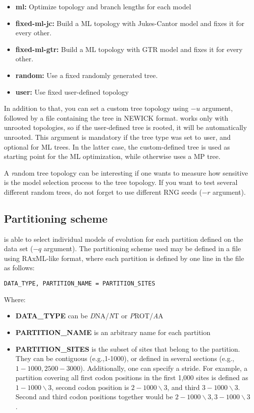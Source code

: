 \begin{itemize}
  \item {\bf ml:} Optimize topology and branch lengths for each model
  \item {\bf fixed-ml-jc:} Build a ML topology with Jukes-Cantor model and fixes it for every other.
  \item {\bf fixed-ml-gtr:} Build a ML topology with GTR model and fixes it for every other.
  \item {\bf random:} Use a fixed randomly generated tree.
  \item {\bf user:} Use fixed user-defined topology
\end{itemize}

In addition to that, you can set a custom tree topology using $-u$ argument, followed by a file containing the tree in NEWICK format.
\modeltest works only with unrooted topologies, so if the user-defined tree is rooted, it will be automatically unrooted.
This argument is mandatory if the tree type was set to {\emph user}, and optional for ML trees.
In the latter case, the custom-defined tree is used as starting point for the ML optimization, while otherwise \modeltest uses a MP tree.

A {\emph random} tree topology can be interesting if one wants to measure how sensitive is the model selection process to the tree topology.
If you want to test several different random trees, do not forget to use different RNG seeds ($-r$ argument).


\subsection{Partitioning scheme}
\label{sec:arg:parts}

\modeltest is able to select individual models of evolution for each partition defined on the data set ($-q$ argument).
The partitioning scheme used may be defined in a file using RAxML-like format, where each partition is defined by one line in the file as follows:

{
\begin{verbatim}
DATA_TYPE, PARTITION_NAME = PARTITION_SITES
\end{verbatim}
}

Where:

\begin{itemize}
	\item {\bf DATA\_TYPE} can be {\emph DNA}/{\emph NT} or {\emph PROT}/{\emph AA}
  \item {\bf PARTITION\_NAME} is an arbitrary name for each partition
  \item {\bf PARTITION\_SITES} is the subset of sites that belong to the partition.
        They can be contiguous (e.g.,1-1000), or defined in several sections (e.g., $1-1000,2500-3000$).
        Additionally, one can specify a stride.
        For example, a partition covering all first codon positions in the first 1,000 sites is defined as $1-1000 \backslash 3$,
        second codon position is $2-1000 \backslash 3$, and third $3-1000 \backslash 3$.
        Second and third codon positions together would be $2-1000 \backslash 3,3-1000 \backslash 3$.
\end{itemize}

